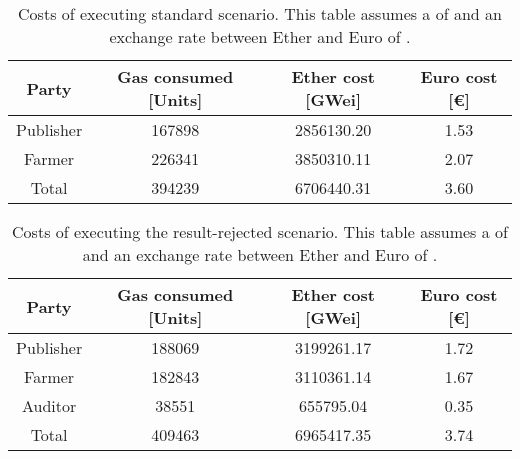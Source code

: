 \begin{table}[p]
    \caption[Cost of running the standard scenario]{Costs of executing standard scenario. This table assumes a  of \gaspricegwei and an exchange rate between Ether and Euro of \ethtoeur.}
    \centering
    \label{table:standard-scenario-costs}
    \begin{tabular}{c c c c}
        \toprule
        Party & Gas consumed [Units] & Ether cost [GWei] & Euro cost [€]\\ 
        \midrule
        Publisher & 167898 & 2856130.20 & 1.53 \\ Farmer & 226341 & 3850310.11 & 2.07 \\ Total & 394239 & 6706440.31 & 3.60 \\
        \bottomrule
    \end{tabular}
\end{table}

\begin{table}[p]
    \caption[Cost of running the result-rejected scenario]{Costs of executing the result-rejected scenario. This table assumes a  of \gaspricegwei and an exchange rate between Ether and Euro of \ethtoeur.}
    \centering
    \label{table:result-rejected-costs}
    \begin{tabular}{c c c c}
        \toprule
        Party & Gas consumed [Units] & Ether cost [GWei] & Euro cost [€]\\ 
        \midrule
        Publisher & 188069 & 3199261.17 & 1.72 \\ Farmer & 182843 & 3110361.14 & 1.67 \\ Auditor & 38551 & 655795.04 & 0.35 \\ Total & 409463 & 6965417.35 & 3.74 \\
        \bottomrule
    \end{tabular}
\end{table}

